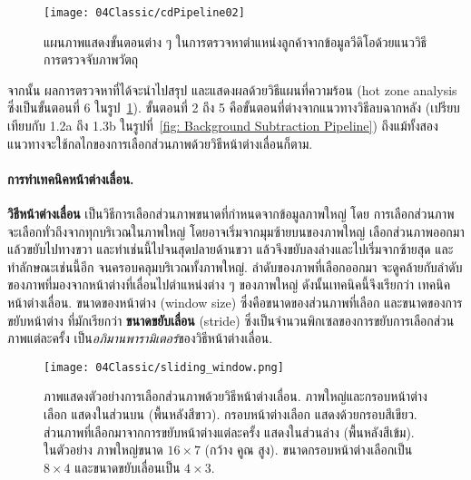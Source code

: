 \begin{figure}
	\centering
	\texttt{[image: 04Classic/cdPipeline02]}
	\caption[วิธีการตรวจจับภาพวัตถุด้วยเทคนิคหน้าต่างเลื่อน]{แผนภาพแสดงขั้นตอนต่าง ๆ ในการตรวจหาตำแหน่งลูกค้าจากข้อมูลวีดิโอด้วยแนววิธีการตรวจจับภาพวัตถุ}
	\label{fig: sliding window pipeline}
\end{figure}


จากนั้น ผลการตรวจหาที่ได้จะนำไปสรุป และแสดงผลด้วยวิธีแผนที่ความร้อน (hot zone analysis ซึ่งเป็นขั้นตอนที่ 6 ในรูป~\ref{fig: sliding window pipeline}).
%
ขั้นตอนที่ 2 ถึง 5 คือขั้นตอนที่ต่างจากแนวทางวิธีลบฉากหลัง (เปรียบเทียบกับ 1.2a ถึง 1.3b ในรูปที่~\ref{fig: Background Subtraction Pipeline}) 
ถึงแม้ทั้งสองแนวทางจะใช้กลไกของการเลือกส่วนภาพด้วยวิธีหน้าต่างเลื่อนก็ตาม.


\paragraph{การทำเทคนิคหน้าต่างเลื่อน.}
%
\textbf{วิธีหน้าต่างเลื่อน}\cite{ViolaJones2001a} เป็นวิธีการเลือกส่วนภาพขนาดที่กำหนดจากข้อมูลภาพใหญ่
โดย
การเลือกส่วนภาพจะเลือกทั่วถึงจากทุกบริเวณในภาพใหญ่
โดยอาจเริ่มจากมุมซ้ายบนของภาพใหญ่
เลือกส่วนภาพออกมา แล้วขยับไปทางขวา และทำเช่นนี้ไปจนสุดปลายด้านขวา
แล้วจึงขยับลงล่างและไปเริ่มจากซ้ายสุด 
และทำลักษณะเช่นนี้อีก จนครอบคลุมบริเวณทั้งภาพใหญ่.
ลำดับของภาพที่เลือกออกมา จะดูคล้ายกับลำดับของภาพที่มองจากหน้าต่างที่เลื่อนไปตำแหน่งต่าง ๆ ของภาพใหญ่
ดังนั้นเทคนิคนี้จึงเรียกว่า เทคนิคหน้าต่างเลื่อน.
%
ขนาดของหน้าต่าง (window size) ซึ่งคือขนาดของส่วนภาพที่เลือก
และขนาดของการขยับหน้าต่าง ที่มักเรียกว่า \textbf{ขนาดขยับเลื่อน} (stride) %
ซึ่งเป็นจำนวนพิกเซลของการขยับการเลือกส่วนภาพแต่ละครั้ง เป็น\textit{อภิมานพารามิเตอร์}ของวิธีหน้าต่างเลื่อน. 
%

%
\begin{figure}
	\begin{center}
		\texttt{[image: 04Classic/sliding\_window.png]}
		\caption[วิธีหน้าต่างเลื่อน]{ภาพแสดงตัวอย่างการเลือกส่วนภาพด้วยวิธีหน้าต่างเลื่อน.
		ภาพใหญ่และกรอบหน้าต่างเลือก แสดงในส่วนบน (พื้นหลังสีขาว).
		กรอบหน้าต่างเลือก แสดงด้วยกรอบสีเขียว.
		ส่วนภาพที่เลือกมาจากการขยับหน้าต่างแต่ละครั้ง แสดงในส่วนล่าง (พื้นหลังสีเข้ม).
		ในตัวอย่าง ภาพใหญ่ขนาด $16 \times 7$ (กว้าง คูณ สูง).
		ขนาดกรอบหน้าต่างเลือกเป็น $8 \times 4$ และขนาดขยับเลื่อนเป็น $4 \times 3$.
		}
		\label{fig: classic sliding window}
	\end{center}
\end{figure}
%

